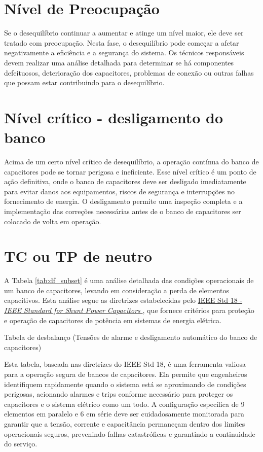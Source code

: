 \documentclass[a4paper]{article}
\begin{document}
\section{Nível de Preocupação}
Se o desequilíbrio continuar a aumentar e atinge um nível maior, ele deve ser tratado com preocupação. Nesta fase, o desequilíbrio pode começar a afetar negativamente a eficiência e a segurança do sistema. Os técnicos responsáveis devem realizar uma análise detalhada para determinar se há componentes defeituosos, deterioração dos capacitores, problemas de conexão ou outras falhas que possam estar contribuindo para o desequilíbrio.

\section{Nível crítico - desligamento do banco}
Acima de um certo nível crítico de desequilíbrio, a operação contínua do banco de capacitores pode se tornar perigosa e ineficiente. Esse nível crítico é um ponto de ação definitiva, onde o banco de capacitores deve ser desligado imediatamente para evitar danos aos equipamentos, riscos de segurança e interrupções no fornecimento de energia. O desligamento permite uma inspeção completa e a implementação das correções necessárias antes de o banco de capacitores ser colocado de volta em operação.

\section{TC ou TP de neutro}
A Tabela \ref{tab:df_subset} é uma análise detalhada das condições operacionais de um banco de capacitores, levando em consideração a perda de elementos capacitivos. Esta análise segue as diretrizes estabelecidas pelo \href{https://ieeexplore.ieee.org/document/6466331}{IEEE Std 18 - \textit{IEEE Standard for Shunt Power Capacitors} \cite{ieee18}}, que fornece critérios para proteção e operação de capacitores de potência em sistemas de energia elétrica.

\begin{table}[htbp]
	\centering
	\caption[]{Tabela de desbalanço (Tensões de alarme e desligamento automático do banco de capacitores)}
	
	\label{tab:df_subset}
\end{table}



Esta tabela, baseada nas diretrizes do IEEE Std 18, é uma ferramenta valiosa para a operação segura de bancos de capacitores. Ela permite que engenheiros identifiquem rapidamente quando o sistema está se aproximando de condições perigosas, acionando alarmes e trips conforme necessário para proteger os capacitores e o sistema elétrico como um todo. A configuração específica de 9 elementos em paralelo e 6 em série deve ser cuidadosamente monitorada para garantir que a tensão, corrente e capacitância permaneçam dentro dos limites operacionais seguros, prevenindo falhas catastróficas e garantindo a continuidade do serviço.
\end{document}
